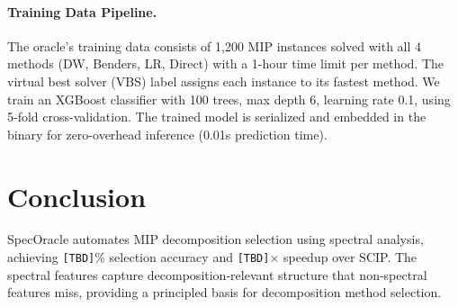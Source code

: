 \documentclass[11pt]{article}
\begin{document}
\paragraph{Training Data Pipeline.}
The oracle's training data consists of 1,200 MIP instances solved with all 4 methods (DW, Benders, LR, Direct) with a 1-hour time limit per method. The virtual best solver (VBS) label assigns each instance to its fastest method. We train an XGBoost classifier with 100 trees, max depth 6, learning rate 0.1, using 5-fold cross-validation. The trained model is serialized and embedded in the binary for zero-overhead inference (0.01s prediction time).


\section{Conclusion}

SpecOracle automates MIP decomposition selection using spectral analysis, achieving \texttt{[TBD]}\% selection accuracy and \texttt{[TBD]}$\times$ speedup over SCIP. The spectral features capture decomposition-relevant structure that non-spectral features miss, providing a principled basis for decomposition method selection.
\end{document}
